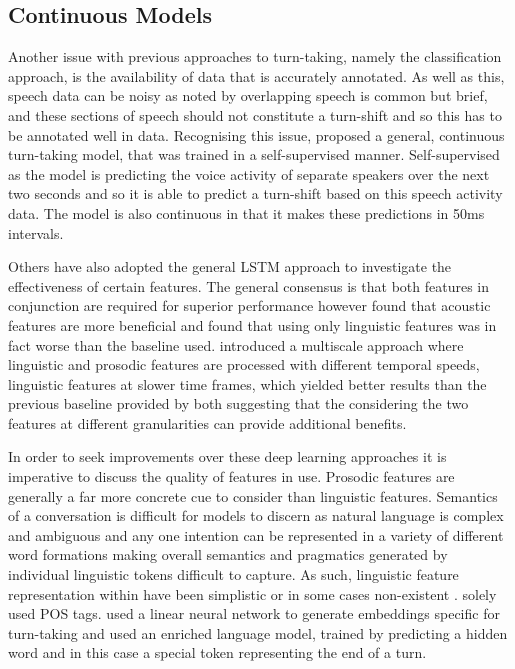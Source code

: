 \documentclass[logo,bsc,singlespacing,parskip]{infthesis}
\begin{document}
\subsection{Continuous Models}
Another issue with previous approaches to turn-taking, namely the classification approach, is the availability of data that is accurately annotated. As well as this, speech data can be noisy as noted by \cite{Sacks1974} overlapping speech is common but brief, and these sections of speech should not constitute a turn-shift and so this has to be annotated well in data. 
Recognising this issue, \cite{Skantze2017} proposed a general, continuous turn-taking model, that was trained in a self-supervised manner. Self-supervised as the model is predicting the voice activity of separate speakers over the next two seconds and so it is able to predict a turn-shift based on this speech activity data. The model is also continuous in that it makes these predictions in 50ms intervals.

Others have also adopted the general LSTM approach \cite{Maier2017, Roddy2018a} to investigate the effectiveness of certain features. The general consensus is that both features in conjunction are required for superior performance however \cite{Roddy2018a} found that acoustic features are more beneficial and \cite{Maier2017} found that using only linguistic features was in fact worse than the baseline used. 
\cite{Roddy2018b} introduced a multiscale approach where linguistic and prosodic features are processed with different temporal speeds, linguistic features at slower time frames, which yielded better results than the previous baseline provided by both \cite{Roddy2018a, Skantze2017} suggesting that the considering the two features at different granularities can provide additional benefits. 

In order to seek improvements over these deep learning approaches it is imperative to discuss the quality of features in use. Prosodic features are generally a far more concrete cue to consider than linguistic features. Semantics of a conversation is difficult for models to discern as natural language is complex and ambiguous and any one intention can be represented in a variety of different word formations making overall semantics and pragmatics generated by individual linguistic tokens difficult to capture. As such, linguistic feature representation within \cite{Roddy2018a, Skantze2017, Maier2017} have been simplistic or in some cases non-existent \cite{Ward2018}. \cite{Skantze2017} solely used POS tags. \cite{Roddy2018a} used a linear neural network to generate embeddings specific for turn-taking and \cite{Maier2017} used an enriched language model, trained by predicting a hidden word and in this case a special token representing the end of a turn. 
\end{document}

